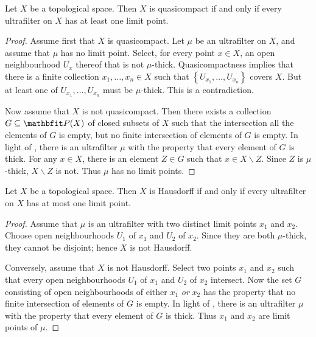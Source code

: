 \begin{lem} \label{quasicompactiffeveryultrafilterhasalimitpoint}
	Let $ X $ be a topological space.
	Then $ X $ is quasicompact if and only if every ultrafilter on $ X $ has at least one limit point.
\end{lem}

\begin{proof}
	Assume first that $ X $ is quasicompact.
	Let $ \mu $ be an ultrafilter on $ X $, and assume that $ \mu $ has no limit point.
	Select, for every point $ x \in X $, an open neighbourhood $ U_x $ thereof that is not $ \mu $-thick.
	Quasicompactness implies that there is a finite collection $ x_1, \dots, x_n \in X $ such that $ \left\{ U_{x_1}, \dots, U_{x_n} \right\} $ covers $ X $.
	But at least one of $ U_{x_1}, \dots, U_{x_n} $ must be $ \mu $-thick.
	This is a contradiction.

	Now assume that $ X $ is not quasicompact.
	Then there exists a collection $ G \subseteq \PP(X) $ of closed subsets of $ X $ such that the intersection all the elements of $ G $ is empty, but no finite intersection of elements of $ G $ is empty.
	In light of , there is an ultrafilter $ \mu $ with the property that every element of $ G $ is thick.
	For any $ x \in X $, there is an element $ Z \in G $ such that $ x \in X \smallsetminus Z $.
	Since $ Z $ is $ \mu $-thick, $ X \smallsetminus Z $ is not.
	Thus $ \mu $ has no limit points.
\end{proof}

\begin{lem} \label{hausdorffiffeveryultrafilterhasatmostonelimitpoint}
	Let $ X $ be a topological space.
	Then $ X $ is Hausdorff if and only if every ultrafilter on $ X $ has at most one limit point.
\end{lem}

\begin{proof}
	Assume that $ \mu $ is an ultrafilter with two distinct limit points $ x_1 $ and $ x_2 $.
	Choose open neighbourhoods $ U_1 $ of $ x_1 $ and $ U_2 $ of $ x_2 $.
	Since they are both $ \mu $-thick, they cannot be disjoint;
	hence $ X $ is not Hausdorff.

	Conversely, assume that $ X $ is not Hausdorff.
	Select two points $ x_1 $ and $ x_2 $ such that every open neighbourhoods $ U_1 $ of $ x_1 $ and $ U_2 $ of $ x_2 $ intersect.
	Now the set $ G $ consisting of open neighbourhoods of either $ x_1 $ \emph{or} $ x_2 $ has the property that no finite intersection of elements of $ G $ is empty.
	In light of , there is an ultrafilter $ \mu $ with the property that every element of $ G $ is thick.
	Thus $ x_1 $ and $ x_2 $ are limit points of $ \mu $.
\end{proof}


